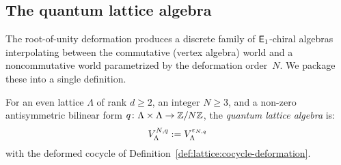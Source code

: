 \subsection{The quantum lattice algebra}

The root-of-unity deformation produces a discrete family of
$\mathsf{E}_1$-chiral algebras interpolating between the commutative (vertex
algebra) world and a noncommutative world parametrized by the
deformation order~$N$.  We package these into a single definition.

\begin{definition}\label{def:quantum-lattice}
For an even lattice $\Lambda$ of rank $d \geq 2$, an integer
$N \geq 3$, and a non-zero antisymmetric bilinear form
$q \colon \Lambda \times \Lambda \to \mathbb{Z}/N\mathbb{Z}$, the
\emph{quantum lattice algebra} is:
\[
V_\Lambda^{N,q}
:= V_\Lambda^{\varepsilon_{N,q}}
\]
with the deformed cocycle of Definition~\ref{def:lattice:cocycle-deformation}.
\end{definition}

